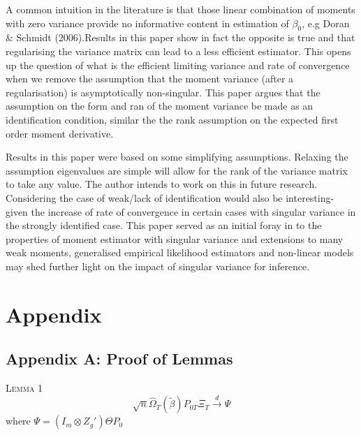 \documentclass[11pt, fleqn]{article}
\begin{document}
A common intuition in the literature is that those linear combination of moments with zero variance provide no informative content in estimation of $\beta_0$, e.g Doran \& Schmidt (2006).Results in this paper show in fact the opposite is true and that regularising the variance matrix can lead to a less efficient estimator. This opens up the question of what is the efficient limiting variance and rate of convergence when we remove the assumption that the moment variance (after a regularisation) is asymptotically non-singular. This paper argues that the assumption on the form and ran of the moment variance be made as an identification condition, similar the the rank assumption on the expected first order moment derivative.

Results in this paper were based on some simplifying assumptions. Relaxing the assumption eigenvalues are simple will allow for the rank of the variance matrix to take any value. The author intends to work on this in future research. Considering the case of weak/lack of identification would also be interesting- given the increase of rate of convergence in certain cases with singular variance in the strongly identified case. This paper served as an initial foray in to the properties of moment estimator with singular variance and extensions to many weak moments, generalised empirical likelihood estimators and non-linear models may shed further light on the impact of singular variance for inference.









\section*{Appendix}








\subsection*{ Appendix A: Proof of Lemmas}



\textsc{Lemma 1}  
\begin{equation} \sqrt{n}\hat{\Omega}_T(\tilde{\beta})P_{0T}\Xi_T \overset{d}{\rightarrow} \Psi \end{equation}
where $\Psi= (I_m \otimes Z_g')\Theta P_0 $\\
\end{document}
